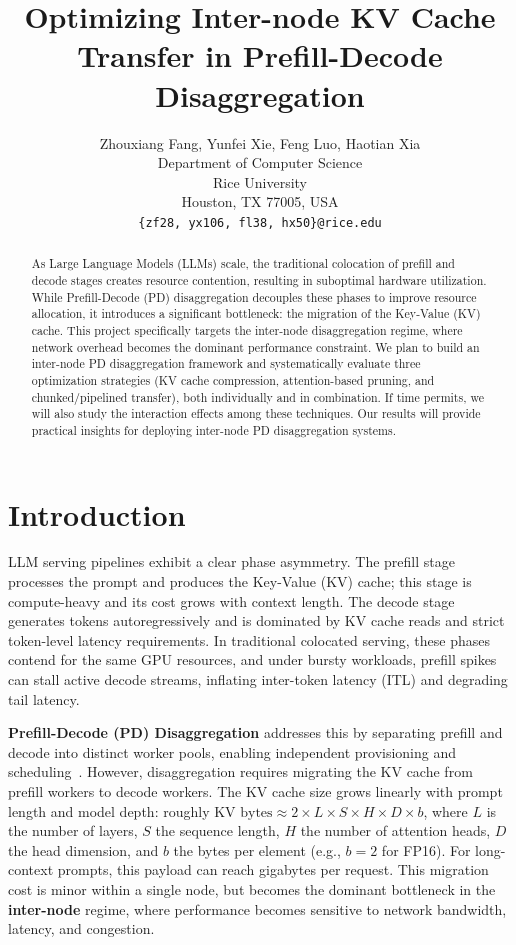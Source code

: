 \documentclass{article} %
\title{Optimizing Inter-node KV Cache Transfer in Prefill-Decode Disaggregation}
\author{Zhouxiang Fang, Yunfei Xie, Feng Luo, Haotian Xia \\
Department of Computer Science\\
Rice University\\
Houston, TX 77005, USA \\
\texttt{\{zf28, yx106, fl38, hx50\}@rice.edu} 
}
\begin{document}
\maketitle

\begin{abstract}
As Large Language Models (LLMs) scale, the traditional colocation of prefill and decode stages creates resource contention, resulting in suboptimal hardware utilization. 
While Prefill-Decode (PD) disaggregation decouples these phases to improve resource allocation, it introduces a significant bottleneck: the migration of the Key-Value (KV) cache. 
This project specifically targets the inter-node disaggregation regime, where network overhead becomes the dominant performance constraint. 
We plan to build an inter-node PD disaggregation framework and systematically evaluate three optimization strategies (KV cache compression, attention-based pruning, and chunked/pipelined transfer), both individually and in combination.
If time permits, we will also study the interaction effects among these techniques.
Our results will provide practical insights for deploying inter-node PD disaggregation systems.
\end{abstract}

\section{Introduction}

LLM serving pipelines exhibit a clear phase asymmetry. 
The prefill stage processes the prompt and produces the Key-Value (KV) cache; this stage is compute-heavy and its cost grows with context length. 
The decode stage generates tokens autoregressively and is dominated by KV cache reads and strict token-level latency requirements. 
In traditional colocated serving, these phases contend for the same GPU resources, and under bursty workloads, prefill spikes can stall active decode streams, inflating inter-token latency (ITL) and degrading tail latency.

\textbf{Prefill-Decode (PD) Disaggregation} addresses this by separating prefill and decode into distinct worker pools, enabling independent provisioning and scheduling~\citep{zhong2024distservedisaggregatingprefilldecoding, patel2024splitwiseefficientgenerativellm, qin2025mooncakekvcachecentricdisaggregatedarchitecture}. 
However, disaggregation requires migrating the KV cache from prefill workers to decode workers. 
The KV cache size grows linearly with prompt length and model depth: roughly $\text{KV bytes} \approx 2 \times L \times S \times H \times D \times b$, where $L$ is the number of layers, $S$ the sequence length, $H$ the number of attention heads, $D$ the head dimension, and $b$ the bytes per element (e.g., $b{=}2$ for FP16).
For long-context prompts, this payload can reach gigabytes per request.
This migration cost is minor within a single node, but becomes the dominant bottleneck in the \textbf{inter-node} regime, where performance becomes sensitive to network bandwidth, latency, and congestion.
\end{document}
